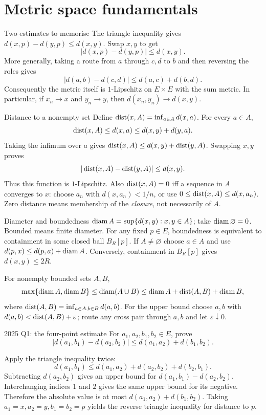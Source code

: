 \clearpage
\setcounter{section}{2}
\section{Metric space fundamentals}

\begin{note}{Two estimates to memorise}
The triangle inequality gives $d(x,p)-d(y,p)\le d(x,y)$. Swap $x,y$ to get
\[|d(x,p)-d(y,p)|\le d(x,y).\]
More generally, taking a route from $a$ through $c,d$ to $b$ and then reversing the roles gives
\[|d(a,b)-d(c,d)|\le d(a,c)+d(b,d).\]
Consequently the metric itself is $1$-Lipschitz on $E\times E$ with the sum metric. In particular, if $x_n\to x$ and $y_n\to y$, then $d(x_n,y_n)\to d(x,y)$.
\end{note}
\begin{note}{Distance to a nonempty set}
Define $\operatorname{dist}(x,A)=\inf_{a\in A}d(x,a)$. For every $a\in A$,
\[\operatorname{dist}(x,A)\le d(x,a)\le d(x,y)+d(y,a).\]
Taking the infimum over $a$ gives $\operatorname{dist}(x,A)\le d(x,y)+\operatorname{dist}(y,A)$. Swapping $x,y$ proves
\[|\operatorname{dist}(x,A)-\operatorname{dist}(y,A)|\le d(x,y).\]
Thus this function is $1$-Lipschitz. Also $\operatorname{dist}(x,A)=0$ iff a sequence in $A$ converges to $x$: choose $a_n$ with $d(x,a_n)<1/n$, or use $0\le\operatorname{dist}(x,A)\le d(x,a_n)$. Zero distance means membership of the \emph{closure}, not necessarily of $A$.
\end{note}
\begin{note}{Diameter and boundedness}
$\operatorname{diam} A=\sup\{d(x,y):x,y\in A\}$; take $\operatorname{diam}\varnothing=0$. Bounded means finite diameter. For any fixed $p\in E$, boundedness is equivalent to containment in some closed ball $B_R[p]$. If $A\ne\varnothing$ choose $a\in A$ and use $d(p,x)\le d(p,a)+\operatorname{diam} A$. Conversely, containment in $B_R[p]$ gives $d(x,y)\le2R$.

For nonempty bounded sets $A,B$,
\[\max\{\operatorname{diam} A,\operatorname{diam} B\}\le\operatorname{diam}(A\cup B)\le\operatorname{diam} A+\operatorname{dist}(A,B)+\operatorname{diam} B,\]
where $\operatorname{dist}(A,B)=\inf_{a\in A,b\in B}d(a,b)$. For the upper bound choose $a,b$ with $d(a,b)<\operatorname{dist}(A,B)+\varepsilon$; route any cross pair through $a,b$ and let $\varepsilon\downarrow0$.
\end{note}
\begin{exam}{2025 Q1: the four-point estimate}
For $a_1,a_2,b_1,b_2\in E$, prove
\[|d(a_1,b_1)-d(a_2,b_2)|\le d(a_1,a_2)+d(b_1,b_2).\]
\end{exam}
\begin{answer}
Apply the triangle inequality twice:
\[d(a_1,b_1)\le d(a_1,a_2)+d(a_2,b_2)+d(b_2,b_1).\]
Subtracting $d(a_2,b_2)$ gives an upper bound for $d(a_1,b_1)-d(a_2,b_2)$. Interchanging indices $1$ and $2$ gives the same upper bound for its negative. Therefore the absolute value is at most $d(a_1,a_2)+d(b_1,b_2)$. Taking $a_1=x,a_2=y,b_1=b_2=p$ yields the reverse triangle inequality for distance to $p$.
\end{answer}
